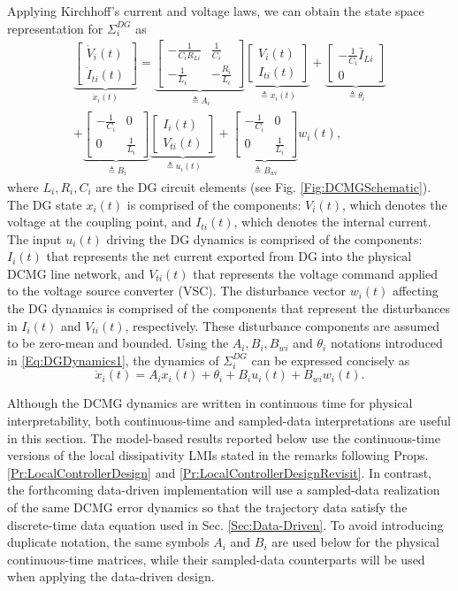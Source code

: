\documentclass[letterpaper, 10 pt, conference]{ieeeconf}%
\newcommand{\0}{\mathbf{0}}
\newcommand{\bm}[1]{\begin{bmatrix}#1\end{bmatrix}}
\begin{document}
Applying Kirchhoff's current and voltage laws, we can obtain the state space representation for $\Sigma_i^{DG}$ as 
\begin{align}\nonumber
\underbrace{\bm{\dot{V}_i(t) \\ \dot{I}_{ti}(t)}}_{\dot{x}_i(t)} = 
\underbrace{\bm{-\frac{1}{C_iR_{Li}} & \frac{1}{C_i} \\ -\frac{1}{L_i} & -\frac{R_i}{L_i}}}_{\triangleq A_i} 
\underbrace{\bm{V_i(t) \\ I_{ti}(t)}}_{\triangleq x_i(t)} 
+ \underbrace{\bm{-\frac{1}{C_i} \bar{I}_{Li} \\ 0}}_{\triangleq \theta_i} \\
+ \underbrace{\bm{-\frac{1}{C_i} & 0 \\ 0 & \frac{1}{L_i}}}_{\triangleq B_i}
\underbrace{\bm{I_i(t) \\ V_{ti}(t)}}_{\triangleq u_i(t)}
+ \underbrace{\bm{-\frac{1}{C_i} & 0 \\ 0 & \frac{1}{L_i}}}_{\triangleq B_{wi}} w_i(t),
\label{Eq:DGDynamics1}
\end{align}
where $L_i,R_i,C_i$ are the DG circuit elements (see Fig. \ref{Fig:DCMGSchematic}). The DG state $x_i(t)$ is comprised of the components: $V_i(t)$, which denotes the voltage at the coupling point, and $I_{ti}(t)$, which denotes the internal current. The input $u_i(t)$ driving the DG dynamics is comprised of the components: $I_i(t)$ that represents the net current exported from DG into the physical DCMG line network, and $V_{ti}(t)$ that represents the voltage command applied to the voltage source converter (VSC). The disturbance vector $w_i(t)$  affecting the DG dynamics is comprised of the components that represent the disturbances in $I_i(t)$ and $V_{ti}(t)$, respectively. These disturbance components are assumed to be zero-mean and bounded. Using the $A_i,B_i,B_{wi}$ and $\theta_i$ notations introduced in \eqref{Eq:DGDynamics1}, the dynamics of $\Sigma_i^{DG}$ can be expressed concisely as 
\begin{equation}\label{Eq:DGDynamics}
\dot{x}_i(t) = A_i x_i(t) + \theta_i + B_i u_i(t) + B_{wi} w_i(t).
\end{equation}

Although the DCMG dynamics are written in continuous time for physical interpretability, both continuous-time and sampled-data interpretations are useful in this section. The model-based results reported below use the continuous-time versions of the local dissipativity LMIs stated in the remarks following Props. \ref{Pr:LocalControllerDesign} and \ref{Pr:LocalControllerDesignRevisit}. In contrast, the forthcoming data-driven implementation will use a sampled-data realization of the same DCMG error dynamics so that the trajectory data satisfy the discrete-time data equation used in Sec. \ref{Sec:Data-Driven}. To avoid introducing duplicate notation, the same symbols $A_i$ and $B_i$ are used below for the physical continuous-time matrices, while their sampled-data counterparts will be used when applying the data-driven design.  
\end{document}
